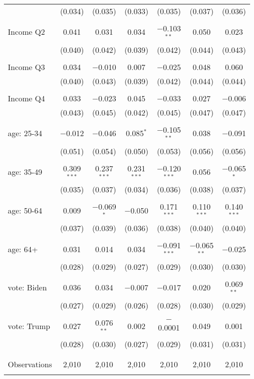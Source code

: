 \begin{tabular}{@{\extracolsep{5pt}}lcccccc}
  & (0.034) & (0.035) & (0.033) & (0.035) & (0.037) & (0.036) \\ 
  & & & & & & \\ 
 Income Q2 & 0.041 & 0.031 & 0.034 & $-$0.103$^{**}$ & 0.050 & 0.023 \\ 
  & (0.040) & (0.042) & (0.039) & (0.042) & (0.044) & (0.043) \\ 
  & & & & & & \\ 
 Income Q3 & 0.034 & $-$0.010 & 0.007 & $-$0.025 & 0.048 & 0.060 \\ 
  & (0.040) & (0.043) & (0.039) & (0.042) & (0.044) & (0.044) \\ 
  & & & & & & \\ 
 Income Q4 & 0.033 & $-$0.023 & 0.045 & $-$0.033 & 0.027 & $-$0.006 \\ 
  & (0.043) & (0.045) & (0.042) & (0.045) & (0.047) & (0.047) \\ 
  & & & & & & \\ 
 age: 25-34 & $-$0.012 & $-$0.046 & 0.085$^{*}$ & $-$0.105$^{**}$ & 0.038 & $-$0.091 \\ 
  & (0.051) & (0.054) & (0.050) & (0.053) & (0.056) & (0.056) \\ 
  & & & & & & \\ 
 age: 35-49 & 0.309$^{***}$ & 0.237$^{***}$ & 0.231$^{***}$ & $-$0.120$^{***}$ & 0.056 & $-$0.065$^{*}$ \\ 
  & (0.035) & (0.037) & (0.034) & (0.036) & (0.038) & (0.037) \\ 
  & & & & & & \\ 
 age: 50-64 & 0.009 & $-$0.069$^{*}$ & $-$0.050 & 0.171$^{***}$ & 0.110$^{***}$ & 0.140$^{***}$ \\ 
  & (0.037) & (0.039) & (0.036) & (0.038) & (0.040) & (0.040) \\ 
  & & & & & & \\ 
 age: 64+ & 0.031 & 0.014 & 0.034 & $-$0.091$^{***}$ & $-$0.065$^{**}$ & $-$0.025 \\ 
  & (0.028) & (0.029) & (0.027) & (0.029) & (0.030) & (0.030) \\ 
  & & & & & & \\ 
 vote: Biden & 0.036 & 0.034 & $-$0.007 & $-$0.017 & 0.020 & 0.069$^{**}$ \\ 
  & (0.027) & (0.029) & (0.026) & (0.028) & (0.030) & (0.029) \\ 
  & & & & & & \\ 
 vote: Trump & 0.027 & 0.076$^{**}$ & 0.002 & $-$0.0001 & 0.049 & 0.001 \\ 
  & (0.028) & (0.030) & (0.027) & (0.029) & (0.031) & (0.031) \\ 
  & & & & & & \\ 
\hline \\[-1.8ex] 

Observations & 2,010 & 2,010 & 2,010 & 2,010 & 2,010 & 2,010 \\ 
\hline 
\hline \\[-1.8ex] 
\end{tabular} 
